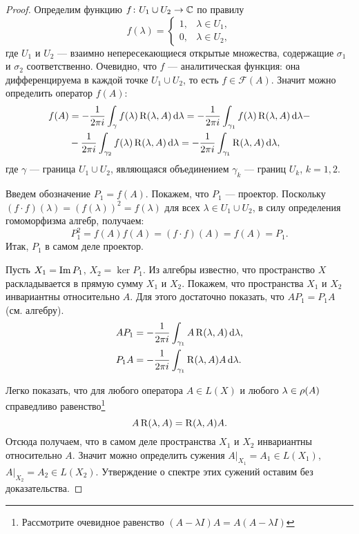 \begin{proof}
    Определим функцию $f \colon U_1 \cup U_2 \to \mathbb{C}$ по правилу
    \[ f(\lambda) = 
        \begin{cases}
            1, & \lambda \in U_1, \\
            0, & \lambda \in U_2,
        \end{cases} \]
    где $U_1$ и $U_2$ --- взаимно непересекающиеся открытые множества, содержащие $\sigma_1$ и 
    $\sigma_2$ соответственно. Очевидно, что $f$ --- аналитическая функция: она дифференцируема
    в каждой точке $U_1 \cup U_2$, то есть $f \in \mathcal F(A)$.
    Значит можно определить оператор $f(A)$:
    \begin{align*}
        f(A) &= -\frac{1}{2\pi i} \int_{\gamma} f(\lambda) \operatorname{R}(\lambda, A) \,\mathrm{d} \lambda 
            = -\frac{1}{2\pi i} \int_{\gamma_1} f(\lambda) \operatorname{R}(\lambda, A) \,\mathrm{d} \lambda - \\ 
            &-\frac{1}{2\pi i} \int_{\gamma_2} f(\lambda) \operatorname{R}(\lambda, A) \,\mathrm{d} \lambda =
            -\frac{1}{2\pi i} \int_{\gamma_1} \operatorname{R}(\lambda, A) \,\mathrm{d} \lambda,
    \end{align*}
    где $\gamma$ --- граница $U_1 \cup U_2$, являющаяся объединением $\gamma_k$ --- границ $U_k$, 
    $k=1,2$.

    Введем обозначение $P_1 = f(A)$. Покажем, что $P_1$ --- проектор. Поскольку 
    $(f\cdot f)(\lambda) = (f(\lambda))^2 = f(\lambda)$ для всех $\lambda \in U_1 \cup U_2$, 
    в силу определения гомоморфизма алгебр, получаем:
    \[ P_1^2 = f(A)f(A) = (f \cdot f)(A) = f(A) = P_1. \]
    Итак, $P_1$ в самом деле проектор.

    Пусть $X_1 = \operatorname{Im} P_1$, $X_2 = \ker P_1$. Из алгебры известно, что пространство $X$
    раскладывается в прямую сумму $X_1$ и $X_2$. Покажем, что пространства $X_1$ и $X_2$ 
    инвариантны относительно $A$. Для этого достаточно показать, что $AP_1 = P_1A$ (см. алгебру).
    \begin{align*}
        AP_1 &= -\frac{1}{2\pi i} \int_{\gamma_1} A \operatorname{R}(\lambda, A) \,\mathrm{d} \lambda, \\
        P_1A &= -\frac{1}{2\pi i} \int_{\gamma_1} \operatorname{R}(\lambda, A) A \,\mathrm{d} \lambda.
    \end{align*}

    Легко показать, что для любого оператора $A \in L(X)$ и любого $\lambda \in \operatorname{\rho}(A)$ 
    справедливо равенство\footnote{Рассмотрите очевидное равенство $(A- \lambda I)A = 
    A(A- \lambda I)$}
    \[ A\operatorname{R}(\lambda, A) = \operatorname{R}(\lambda, A)A.\]
    Отсюда получаем, что в самом деле пространства $X_1$ и $X_2$ инвариантны относительно $A$.
    Значит можно определить сужения $A|_{X_1} = A_1 \in L(X_1)$, $A|_{X_2} = A_2 \in L(X_2)$.
    Утверждение о спектре этих сужений оставим без доказательства.
\end{proof}
